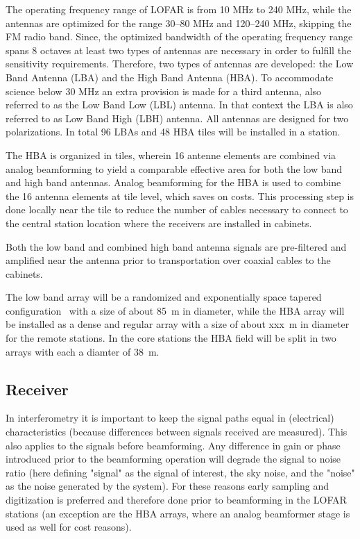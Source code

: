\documentclass[journal]{IEEEtran}
\begin{document}
The operating frequency range of LOFAR is from 10 MHz to 240 MHz, while the antennas are optimized for the range 30--80 MHz and 120--240 MHz, skipping the FM radio band. Since, the optimized bandwidth of the operating frequency range spans 8 octaves at least two types of antennas are necessary in order to fulfill the sensitivity requirements. Therefore, two types of antennas are developed: the Low Band Antenna (LBA) and the High Band Antenna (HBA). To accommodate science below 30 MHz an extra provision is made for a third antenna, also referred to as the Low Band Low (LBL) antenna. In that context the LBA is also referred to as Low Band High (LBH) antenna. All antennas are designed for two polarizations. In total 96 LBAs and 48 HBA tiles will be installed in a station. 

The HBA is organized in tiles, wherein 16 antenne elements are combined via analog beamforming to yield a comparable effective area for both the low band and high band antennas. Analog beamforming for the HBA is used to combine the 16 antenna elements at tile level, which saves on costs. This processing step is done locally near the tile to reduce the number of cables necessary to connect to the central station location where the receivers are installed in cabinets.

Both the low band and combined high band antenna signals are pre-filtered and amplified near the antenna prior to transportation over coaxial cables to the cabinets.

The low band array will be a randomized and exponentially space tapered configuration~\cite{capp:06} with a size of about 85~m in diameter, while the HBA array will be installed as a dense and regular array with a size of about xxx~m in diameter for the remote stations. In the core stations the HBA field will be split in two arrays with each a diamter of 38~m. 

\subsection{Receiver}

In interferometry it is important to keep the signal paths equal in (electrical) characteristics (because differences between signals received are measured). This also applies to the signals before beamforming. Any difference in gain or phase introduced prior to the beamforming operation will degrade the signal to noise ratio (here defining "signal" as the signal of interest, the sky noise, and the "noise" as the noise generated by the system). For these reasons early sampling and digitization is preferred and therefore done prior to beamforming in the LOFAR stations (an exception are the HBA arrays, where an analog beamformer stage is used as well for cost reasons). 
\end{document}
